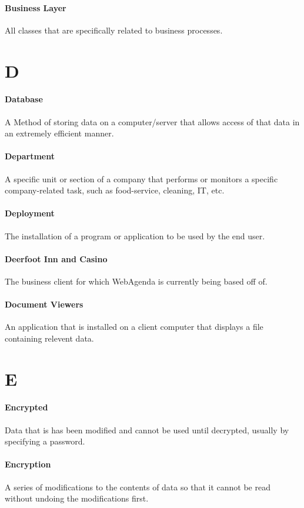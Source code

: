 \documentclass[letterpaper,12pt]{report}
\begin{document}
\paragraph{Business Layer} All classes that are specifically related to business processes.
\section*{D}
\paragraph{Database} A Method of storing data on a computer/server that allows access of that data in an extremely efficient manner.
\paragraph{Department} A specific unit or section of a company that performs or monitors a specific company-related task, such as food-service, cleaning, IT, etc.
\paragraph{Deployment} The installation of a program or application to be used by the end user.
\paragraph{Deerfoot Inn and Casino} The business client for which WebAgenda is currently being based off of.
\paragraph{Document Viewers} An application that is installed on a client computer that displays a file containing relevent data.
\section*{E}
\paragraph{Encrypted} Data that is has been modified and cannot be used until decrypted, usually by specifying a password.
\paragraph{Encryption} A series of modifications to the contents of data so that it cannot be read without undoing the modifications first.
\end{document}
